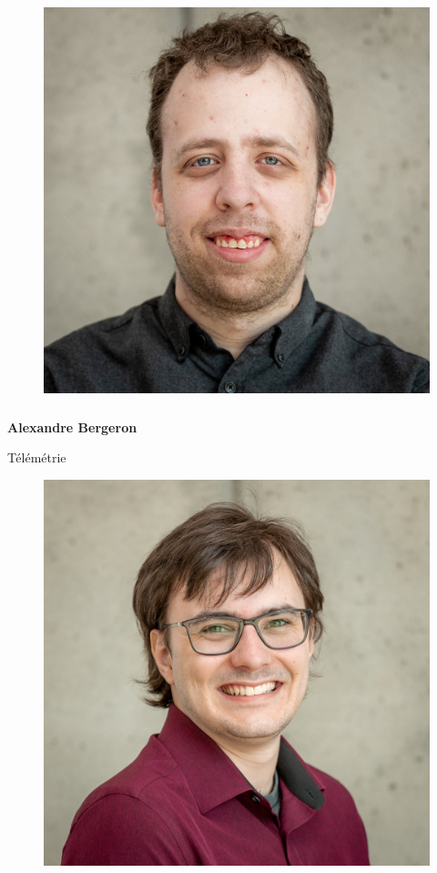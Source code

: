 \documentclass[a0paper,portrait]{baposter}
\begin{document}
\begin{poster}
{%
\begin{figure}
\includegraphics[width=0.9\linewidth]{img/membres/Alexandre-Bergeron-2.jpg} 
\end{figure}
\subsubsection*{}
\vspace{2mm}
\textbf{Alexandre Bergeron}


Télémétrie
\begin{figure}
\includegraphics[width=.9\linewidth]{img/membres/Malik-Claveau-2.jpg} 
\end{figure}
}
\end{poster}
\end{document}
